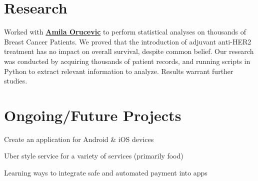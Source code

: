 \documentclass[letterpaper]{deedy-resume} %
\begin{document}
\begin{minipage}[t]{0.66\textwidth}
  \sectionspace %


  \section{Research}


  Worked with \textbf{\href{http://gsm.utmck.edu/pathology/faculty/orucevic.cfm}{Amila Orucevic}} to perform statistical analyses on thousands of Breast Cancer Patients. We proved that the introduction of adjuvant anti-HER2 treatment has no impact on overall survival, despite common belief. Our research was conducted by acquiring thousands of patient records, and running scripts in Python to extract relevant information to analyze. Results warrant further studies.

  \sectionspace %


  \section{Ongoing/Future Projects}



  \vspace{\topsep} %

  \begin{tightitemize}
  \item Create an application for Android \& iOS devices
  \item Uber style service for a variety of services (primarily food)
  \item Learning ways to integrate safe and automated payment into apps
  \end{tightitemize}

  \sectionspace %



\end{minipage}
\end{document}
